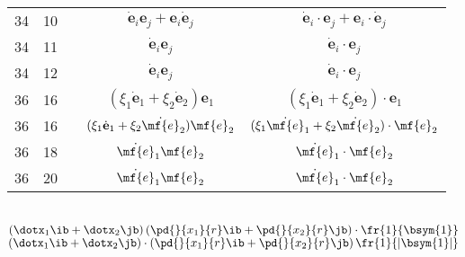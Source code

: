 \documentclass[a4paper,11pt]{article}
\begin{document}
\begin{center}
\begin{tabular}{|c|c|c|c|c|}
    34  & 10 & & $\dot{ \mathbf{ e } }_{ i } \mathbf{ e }_{ j }
                 + \mathbf{ e }_{ i } \dot{ \mathbf{ e } }_{ j }$
           & $\dot{ \mathbf{ e } }_{ i } \cdot \mathbf{ e }_{ j }
             + \mathbf{ e }_{ i } \cdot \dot{ \mathbf{ e } }_{ j }$ \\
    34  & 11 & & $\dot{ \mathbf{ e } }_{ i } \mathbf{ e }_{ j }$
           & $\dot{ \mathbf{ e } }_{ i } \cdot \mathbf{ e }_{ j }$ \\
    34  & 12 & & $\dot{ \mathbf{ e } }_{ i } \mathbf{ e }_{ j }$
           & $\dot{ \mathbf{ e } }_{ i } \cdot \mathbf{ e }_{ j }$ \\
    36  & 16 & & $( \xi_{ 1 } \dot{ \mathbf{ e } }_{ 1 } + \xi_{ 2 }
                 \dot{ \mathbf{ e } }_{ 2 }  ) \mathbf{ e }_{ 1 }$
           & $( \xi_{ 1 } \dot{ \mathbf{ e } }_{ 1 } + \xi_{ 2 }
             \dot{ \mathbf{ e } }_{ 2 }  ) \cdot \mathbf{ e }_{ 1 }$ \\
    36  & 16 & & $( \xi_{ 1 } \dot{ \mathbf{ e } }_{ 1 } + \xi_{ 2 }
                 \dot{ \mf{ e } }_{ 2 }  ) \mf{ e }_{ 2 }$
           & $( \xi_{ 1 } \dot{ \mf{ e } }_{ 1 } + \xi_{ 2 }
             \dot{ \mf{ e } }_{ 2 }  ) \cdot \mf{ e }_{ 2 }$ \\
    36  & 18 & & $\dot{ \mf{ e } }_{ 1 } \mf{ e }_{ 2 }$
           & $\dot{ \mf{ e } }_{ 1 } \cdot \mf{ e }_{ 2 }$ \\
    36  & 20 & & $\dot{ \mf{ e } }_{ 1 } \mf{ e }_{ 2 }$
           & $\dot{ \mf{ e } }_{ 1 } \cdot \mf{ e }_{ 2 }$ \\
    \hline
  \end{tabular}
\end{center}
\noi
{} \\
\Jest
$( \dotx_{ 1 } \ib + \dotx_{ 2 } \jb ) \left( \pd{}{ x_{ 1 } }{ r }
  \ib + \pd{}{ x_{ 2 } }{ r } \jb \right)
\cdot \fr{ 1 }{ \bsym{ 1 } }$ \\
\Pow
$( \dotx_{ 1 } \ib + \dotx_{ 2 } \jb ) \cdot \left( \pd{}{ x_{ 1 } }{
    r } \ib + \pd{}{ x_{ 2 } }{ r } \jb \right)
\fr{ 1 }{ | \bsym{ 1 } | }$ \\

\vspace{\spaceTwo}





 {}



\end{document}
